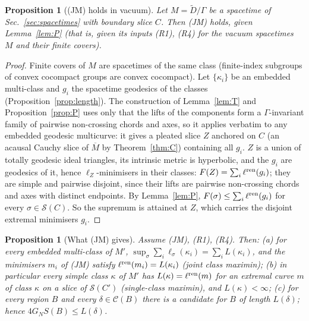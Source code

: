 \documentclass[aps,prd,onecolumn,superscriptaddress,nofootinbib,amsmath,amssymb,11pt]{revtex4-2}
\newtheorem{proposition}[theorem]{Proposition}
\theoremstyle{definition}
\newcommand{\Cut}{\mathcal{C}}
\newcommand{\Dt}{\tilde D}
\newcommand{\Mbar}{\overline{M}}
\begin{document}
\begin{proposition}[(JM) holds in vacuum]\label{prop:JMvac}
Let $M=\Dt/\Gamma$ be a spacetime of Sec.~\ref{sec:spacetimes} with boundary slice $C$. Then (JM) holds, given
Lemma~\ref{lem:P} (that is, given its inputs (R1), (R4) for the vacuum spacetimes $M$ and their finite covers).
\end{proposition}

\begin{proof}
Finite covers of $M$ are spacetimes of the same class (finite-index subgroups of convex cocompact groups are convex
cocompact). Let $\{\kappa_i\}$ be an embedded multi-class and $g_i$ the spacetime geodesics of the classes
(Proposition~\ref{prop:length}). The construction of Lemma~\ref{lem:T} and Proposition~\ref{prop:P} uses only that the lifts
of the components form a $\Gamma$-invariant family of pairwise non-crossing chords and axes, so it applies verbatim to any
embedded geodesic multicurve: it gives a pleated slice $Z$ anchored on $C$ (an acausal Cauchy slice of $\Mbar$ by
Theorem~\ref{thm:C}) containing all $g_i$. $Z$ is a union of totally geodesic ideal triangles, its intrinsic metric is
hyperbolic, and the $g_i$ are geodesics of it, hence $\ell_Z$-minimisers in their classes: $F(Z)=\sum_i\ell^{\rm ren}(g_i)$; they
are simple and pairwise disjoint, since their lifts are pairwise non-crossing chords and axes with distinct endpoints.
By Lemma~\ref{lem:P}, $F(\sigma)\le\sum_i\ell^{\rm ren}(g_i)$ for every $\sigma\in\mathcal S(C)$. So the supremum is attained at
$Z$, which carries the disjoint extremal minimisers $g_i$.
\end{proof}

\begin{proposition}[What (JM) gives]\label{prop:JMcons}
Assume (JM), (R1), (R4). Then:
(a) for every embedded multi-class of $M'$, $\sup_\sigma\sum_i\ell_\sigma(\kappa_i)=\sum_iL(\kappa_i)$, and the minimisers $m_i$
of (JM) satisfy $\ell^{\rm ren}(m_i)=L(\kappa_i)$ (joint class maximin);
(b) in particular every simple class $\kappa$ of $M'$ has $L(\kappa)=\ell^{\rm ren}(m)$ for an extremal curve $m$ of class
$\kappa$ on a slice of $\mathcal S(C')$ (single-class maximin), and $L(\kappa)<\infty$;
(c) for every region $B$ and every $\delta\in\Cut(B)$ there is a candidate for $B$ of length $L(\delta)$; hence
$4G_NS(B)\le L(\delta)$.
\end{proposition}
\end{document}
